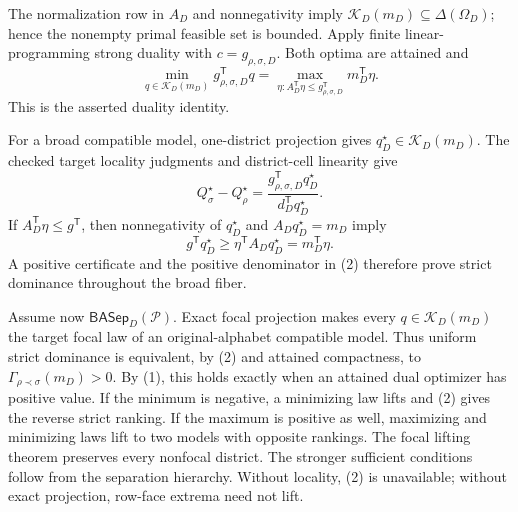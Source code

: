 The normalization row in \(A_D\) and nonnegativity imply \(\mathcal K_D(m_D)\subseteq\Delta(\Omega_D)\); hence the nonempty primal feasible set is bounded.  Apply finite linear-programming strong duality with \(c=g_{\rho,\sigma,D}\).  Both optima are attained and
\[
\min_{q\in\mathcal K_D(m_D)}g_{\rho,\sigma,D}^{\mathsf T}q
=\max_{\eta:A_D^{\mathsf T}\eta\le g_{\rho,\sigma,D}^{\mathsf T}}
m_D^{\mathsf T}\eta.
\tag{1}
\]
This is the asserted duality identity.

For a broad compatible model, one-district projection gives \(q_D^\star\in\mathcal K_D(m_D)\).  The checked target locality judgments and district-cell linearity give
\[
Q_\sigma^\star-Q_\rho^\star
=\frac{g_{\rho,\sigma,D}^{\mathsf T}q_D^\star}
{d_D^{\mathsf T}q_D^\star}.
\tag{2}
\]
If \(A_D^{\mathsf T}\eta\le g^{\mathsf T}\), then nonnegativity of \(q_D^\star\) and \(A_Dq_D^\star=m_D\) imply
\[
g^{\mathsf T}q_D^\star\ge
\eta^{\mathsf T}A_Dq_D^\star=m_D^{\mathsf T}\eta.
\]
A positive certificate and the positive denominator in (2) therefore prove strict dominance throughout the broad fiber.

Assume now \(\mathsf{BASep}_D(\mathcal P)\).  Exact focal projection makes every \(q\in\mathcal K_D(m_D)\) the target focal law of an original-alphabet compatible model.  Thus uniform strict dominance is equivalent, by (2) and attained compactness, to \(\Gamma_{\rho\prec\sigma}(m_D)>0\).  By (1), this holds exactly when an attained dual optimizer has positive value.  If the minimum is negative, a minimizing law lifts and (2) gives the reverse strict ranking.  If the maximum is positive as well, maximizing and minimizing laws lift to two models with opposite rankings.  The focal lifting theorem preserves every nonfocal district.  The stronger sufficient conditions follow from the separation hierarchy.  Without locality, (2) is unavailable; without exact projection, row-face extrema need not lift.